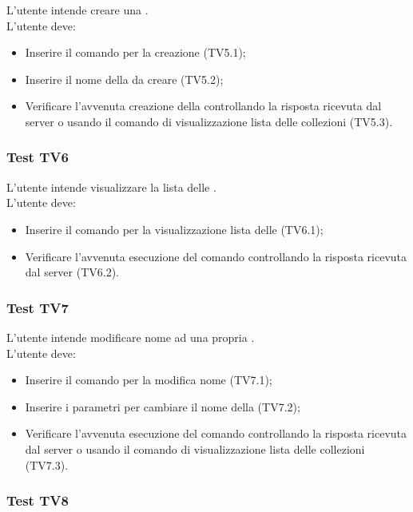 \documentclass{scalatekids-article}
\begin{document}
L'utente intende creare una .\\
L'utente deve:
\begin{itemize}
\item Inserire il comando per la creazione  (TV5.1);
\item Inserire il nome della  da creare (TV5.2);
\item Verificare l'avvenuta creazione della  controllando la
  risposta ricevuta dal server o usando il comando di visualizzazione
  lista delle collezioni (TV5.3).
\end{itemize}

\subsubsection{Test TV6}

L'utente intende visualizzare la lista delle .\\
L'utente deve:
\begin{itemize}
\item Inserire il comando per la visualizzazione lista delle  (TV6.1);
\item Verificare l'avvenuta esecuzione del comando controllando la risposta ricevuta dal server (TV6.2).
\end{itemize}

\subsubsection{Test TV7}

L'utente intende modificare nome ad una propria .\\
L'utente deve:
\begin{itemize}
\item Inserire il comando per la modifica nome  (TV7.1);
\item Inserire i parametri per cambiare il nome della  (TV7.2);
\item Verificare l'avvenuta esecuzione del comando controllando la risposta ricevuta dal server o usando il comando di visualizzazione lista delle collezioni (TV7.3).
\end{itemize}

\subsubsection{Test TV8}
\end{document}
